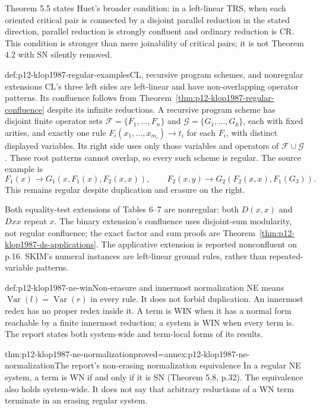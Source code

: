 Theorem 5.5 states Huet's broader condition: in a left-linear TRS, when
each oriented critical pair is connected by a disjoint parallel reduction
in the stated direction, parallel reduction is strongly confluent and
ordinary reduction is CR. This condition is stronger than mere joinability
of critical pairs; it is not Theorem 4.2 with SN silently removed.

\begin{hbexample}{def:p12-klop1987-regular-examples}{CL, recursive program schemes, and nonregular extensions}
CL's three left sides are left-linear and have non-overlapping operator
patterns. Its confluence follows from
Theorem~\ref{thm:p12-klop1987-regular-confluence} despite its infinite
reductions. A recursive program scheme has disjoint finite operator sets
\(\mathcal F=\{F_1,\ldots,F_n\}\) and
\(\mathcal G=\{G_1,\ldots,G_k\}\), each with fixed arities, and
exactly one rule \(F_i(x_1,\ldots,x_{m_i})\to t_i\) for each
\(F_i\), with distinct displayed variables. Its right side uses only
those variables and operators of \(\mathcal F\cup\mathcal G\).
These root patterns cannot overlap, so every such scheme is regular.
The source example is
\[
 F_1(x)\to G_1(x,F_1(x),F_2(x,x)),\qquad
 F_2(x,y)\to G_2(F_2(x,x),F_1(G_3)).
\]
This remains regular despite duplication and erasure on the right.

Both equality-test extensions of Tables 6--7 are nonregular: both
\(D(x,x)\) and \(Dxx\) repeat \(x\). The binary extension's
confluence uses disjoint-sum modularity, not regular confluence;
the exact factor and sum proofs are
Theorem~\ref{thm:p12-klop1987-ds-applications}.
The applicative extension is reported nonconfluent on p.16.
SKIM's numeral instances are left-linear ground rules, rather than
repeated-variable patterns.
\end{hbexample}

\begin{hbdefinition}{def:p12-klop1987-ne-win}{Non-erasure and innermost normalization}
NE means \(\operatorname{Var}(l)=\operatorname{Var}(r)\) in every rule.
It does not forbid duplication. An innermost redex has no proper redex
inside it. A term is WIN when it has a normal form reachable by a finite
innermost reduction; a system is WIN when every term is.
The report states both system-wide and term-local forms of its results.
\end{hbdefinition}

\begin{hbtheorem}{thm:p12-klop1987-ne-normalization}{proved=annex:p12-klop1987-ne-normalization}{The report's non-erasing normalization equivalence}
In a regular NE system, a term is WN if and only if it is SN
(Theorem 5.8, p.32). The equivalence also holds system-wide.
It does not say that arbitrary reductions of a WN term terminate
in an erasing regular system.
\end{hbtheorem}

